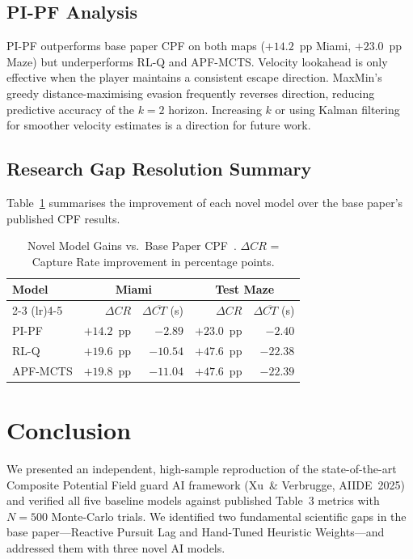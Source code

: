 \documentclass[conference,onecolumn]{IEEEtran}
\begin{document}
\subsection{PI-PF Analysis}
PI-PF outperforms base paper CPF on both maps ($+14.2$~pp Miami,
$+23.0$~pp Maze) but underperforms RL-Q and APF-MCTS. Velocity
lookahead is only effective when the player maintains a consistent
escape direction. MaxMin's greedy distance-maximising evasion
frequently reverses direction, reducing predictive accuracy of the
$k{=}2$ horizon. Increasing $k$ or using Kalman filtering for
smoother velocity estimates is a direction for future work.

\subsection{Research Gap Resolution Summary}
Table~\ref{tab:gaps} summarises the improvement of each novel model
over the base paper's published CPF results.

\begin{table}[h]
\caption{Novel Model Gains vs.\ Base Paper CPF~\cite{xu2025}.
$\Delta CR$ = Capture Rate improvement in percentage points.}
\label{tab:gaps}
\centering
\renewcommand{\arraystretch}{1.2}
\begin{tabular}{l r r r r}
\toprule
\textbf{Model} &
\multicolumn{2}{c}{\textbf{Miami}} &
\multicolumn{2}{c}{\textbf{Test Maze}} \\
\cmidrule(lr){2-3} \cmidrule(lr){4-5}
& $\Delta CR$ & $\Delta\overline{CT}$ (s)
& $\Delta CR$ & $\Delta\overline{CT}$ (s) \\
\midrule
PI-PF    & $+14.2$~pp & $-2.89$ & $+23.0$~pp & $-2.40$ \\
RL-Q     & $+19.6$~pp & $-10.54$& $+47.6$~pp & $-22.38$ \\
APF-MCTS & $+19.8$~pp & $-11.04$& $+47.6$~pp & $-22.39$ \\
\bottomrule
\end{tabular}
\end{table}

\section{Conclusion}

We presented an independent, high-sample reproduction of the
state-of-the-art Composite Potential Field guard AI framework
(Xu~\& Verbrugge, AIIDE~2025) and verified all five baseline
models against published Table~3 metrics with $N{=}500$ Monte-Carlo
trials. We identified two fundamental scientific gaps in the base
paper---Reactive Pursuit Lag and Hand-Tuned Heuristic Weights---and
addressed them with three novel AI models.
\end{document}
